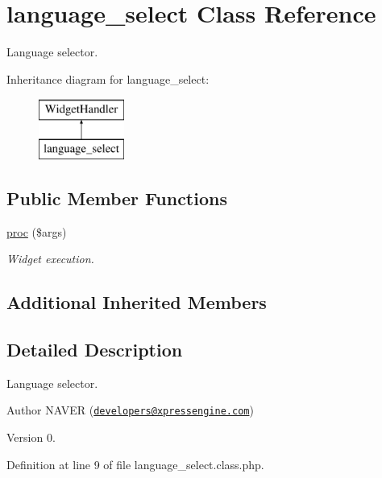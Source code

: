 \hypertarget{classlanguage__select}{\section{language\-\_\-select Class Reference}
\label{classlanguage__select}
}


Language selector.  


Inheritance diagram for language\-\_\-select\-:\begin{figure}[H]
\begin{center}
\leavevmode
\includegraphics[height=2.000000cm]{classlanguage__select}
\end{center}
\end{figure}
\subsection*{Public Member Functions}
\begin{DoxyCompactItemize}
\item 
\hyperlink{classlanguage__select_a6c93581389af6a3ca6d149d384196479}{proc} (\$args)
\begin{DoxyCompactList}\small\item\em Widget execution. \end{DoxyCompactList}\end{DoxyCompactItemize}
\subsection*{Additional Inherited Members}


\subsection{Detailed Description}
Language selector. 

\begin{DoxyAuthor}{Author}
N\-A\-V\-E\-R (\href{mailto:developers@xpressengine.com}{\tt developers@xpressengine.\-com}) 
\end{DoxyAuthor}
\begin{DoxyVersion}{Version}
0. 
\end{DoxyVersion}


Definition at line 9 of file language\-\_\-select.\-class.\-php.



